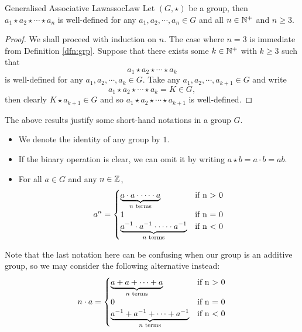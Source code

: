 \documentclass[math]{amznotes}
\theoremstyle{remark}
\newcommand{\0}{\mathbf{0}}
\newcommand{\1}{\mathbf{1}}
\begin{document}
\begin{thmbox}{Generalised Associative Law}{assocLaw}
    Let $\left(G, \star\right)$ be a group, then $a_1 \star a_2 \star \cdots \star a_n$ is well-defined for any $a_1, a_2, \cdots, a_n \in G$ and all $n \in \mathbb{N}^+$ and $n \geq 3$.
    \tcblower
    \begin{proof}
        We shall proceed with induction on $n$. The case where $n = 3$ is immediate from Definition \ref{dfn:grp}. Suppose that there exists some $k \in \mathbb{N}^+$ with $k \geq 3$ such that 
        \begin{equation*}
            a_1 \star a_2 \star \cdots \star a_k
        \end{equation*}
        is well-defined for any $a_1, a_2, \cdots, a_k \in G$. Take any $a_1, a_2, \cdots, a_{k + 1} \in G$ and write 
        \begin{equation*}
            a_1 \star a_2 \star \cdots \star a_k = K \in G,
        \end{equation*}
        then clearly $K \star a_{k + 1} \in G$ and so $a_1 \star a_2 \star \cdots \star a_{k + 1}$ is well-defined.
    \end{proof}
\end{thmbox}
The above results justify some short-hand notations in a group $G$. 
\begin{itemize}
    \item We denote the identity of any group by $1$.
    \item If the binary operation is clear, we can omit it by writing $a \star b = a \cdot b = ab$.
    \item For all $a \in G$ and any $n \in \mathbb{Z}$, 
    \begin{equation*}
        a^n = \begin{cases}
            \underbrace{a \cdot a \cdot \cdots \cdot a}_{n \text{ terms}} & \textrm{if } $n > 0$ \\
            1 & \textrm{if } $n = 0$ \\
            \underbrace{a^{-1} \cdot a^{-1} \cdot \cdots \cdot a^{-1}}_{n \textrm{ terms}} & \textrm{if } $n < 0$ \\
        \end{cases}
    \end{equation*}
\end{itemize}
Note that the last notation here can be confusing when our group is an additive group, so we may consider the following alternative instead:
\begin{equation*}
    n \cdot a = \begin{cases}
        \underbrace{a + a + \cdots + a}_{n \text{ terms}} & \textrm{if } $n > 0$ \\
        0 & \textrm{if } $n = 0$ \\
        \underbrace{a^{-1} + a^{-1} + \cdots + a^{-1}}_{n \textrm{ terms}} & \textrm{if } $n < 0$ \\
    \end{cases}
\end{equation*}
\end{document}
